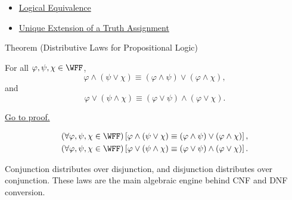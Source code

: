 \begin{dependencies}
\begin{itemize}
  \item \hyperref[def:logical-equivalence-propositional-logic]{Logical Equivalence}
  \item \hyperref[thm:unique-extension-truth-assignment-propositional-logic]{Unique Extension of a Truth Assignment}
\end{itemize}
\end{dependencies}
\begin{theorembox}{Theorem (Distributive Laws for Propositional Logic)}
\begin{theorem}
\label{thm:distributive-laws-propositional-logic}
For all \(\varphi,\psi,\chi\in\WFF\),
\[
\varphi\land(\psi\lor\chi)
\equiv
(\varphi\land\psi)\lor(\varphi\land\chi),
\]
and
\[
\varphi\lor(\psi\land\chi)
\equiv
(\varphi\lor\psi)\land(\varphi\lor\chi).
\]

\noindent\hyperref[prf:distributive-laws-propositional-logic]{Go to proof.}
\end{theorem}
\end{theorembox}
\begin{remark*}
\[
\begin{gathered}
(\forall\varphi,\psi,\chi\in\WFF)
\left[
\varphi\land(\psi\lor\chi)
\equiv
(\varphi\land\psi)\lor(\varphi\land\chi)
\right],\\
(\forall\varphi,\psi,\chi\in\WFF)
\left[
\varphi\lor(\psi\land\chi)
\equiv
(\varphi\lor\psi)\land(\varphi\lor\chi)
\right].
\end{gathered}
\]
\end{remark*}




\begin{remark*}[Interpretation]
Conjunction distributes over disjunction, and disjunction distributes over conjunction. These laws are the main algebraic engine behind CNF and DNF conversion.
\end{remark*}

